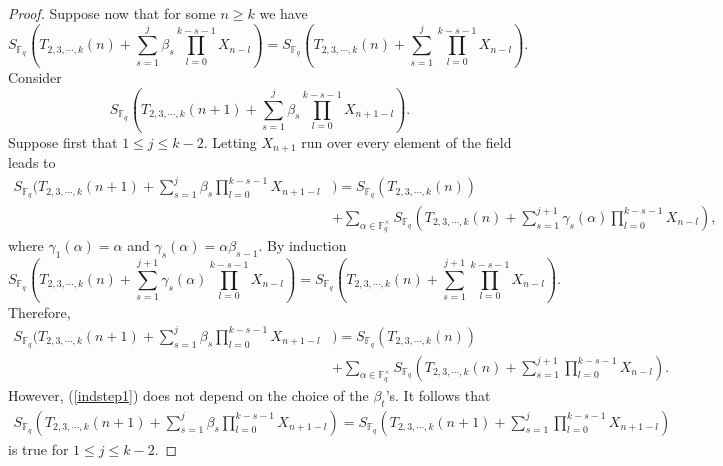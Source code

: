 \begin{proof}
Suppose now that for some $n\geq k$ we have 
\begin{equation}
 S_{\mathbb{F}_q}\left(T_{2,3,\cdots,k}(n)+\sum_{s=1}^j\beta_s\prod_{l=0}^{k-s-1}X_{n-l}\right)=S_{\mathbb{F}_q}\left(T_{2,3,\cdots,k}(n)+\sum_{s=1}^j\prod_{l=0}^{k-s-1}X_{n-l}\right).
\end{equation}
Consider 
\begin{equation}
 S_{\mathbb{F}_q}\left(T_{2,3,\cdots,k}(n+1)+\sum_{s=1}^j\beta_s\prod_{l=0}^{k-s-1}X_{n+1-l}\right).
\end{equation}
Suppose first that $1\leq j \leq k-2$.  Letting $X_{n+1}$ run over every element of the field leads to 
\begin{align}\nonumber
  S_{\mathbb{F}_q}(T_{2,3,\cdots,k}(n+1)+\sum_{s=1}^j\beta_s\prod_{l=0}^{k-s-1}X_{n+1-l}&)=S_{\mathbb{F}_q}\left(T_{2,3,\cdots,k}(n)\right)\\
  &+\sum_{\alpha\in\mathbb{F}_q^{\times}}  S_{\mathbb{F}_q}\left(T_{2,3,\cdots,k}(n)+\sum_{s=1}^{j+1}\gamma_s(\alpha)\prod_{l=0}^{k-s-1}X_{n-l}\right),
\end{align}
where $\gamma_1(\alpha)=\alpha$ and $\gamma_s(\alpha) = \alpha \beta_{s-1}$.  By induction
\begin{equation}
 S_{\mathbb{F}_q}\left(T_{2,3,\cdots,k}(n)+\sum_{s=1}^{j+1}\gamma_s(\alpha)\prod_{l=0}^{k-s-1}X_{n-l}\right)=S_{\mathbb{F}_q}\left(T_{2,3,\cdots,k}(n)+\sum_{s=1}^{j+1}\prod_{l=0}^{k-s-1}X_{n-l}\right).
\end{equation}
Therefore,
\begin{align}\nonumber
\label{indstep1}
  S_{\mathbb{F}_q}(T_{2,3,\cdots,k}(n+1)+\sum_{s=1}^j\beta_s\prod_{l=0}^{k-s-1}X_{n+1-l}&)= S_{\mathbb{F}_q}\left(T_{2,3,\cdots,k}(n)\right)\\
  &+\sum_{\alpha\in\mathbb{F}_q^{\times}}  S_{\mathbb{F}_q}\left(T_{2,3,\cdots,k}(n)+\sum_{s=1}^{j+1}\prod_{l=0}^{k-s-1}X_{n-l}\right).
\end{align}
However, (\ref{indstep1}) does not depend on the choice of the $\beta_t$'s. It follows that
\begin{align}\nonumber
  S_{\mathbb{F}_q}\left(T_{2,3,\cdots,k}(n+1)+\sum_{s=1}^j\beta_s\prod_{l=0}^{k-s-1}X_{n+1-l}\right)= S_{\mathbb{F}_q}\left(T_{2,3,\cdots,k}(n+1)+\sum_{s=1}^j\prod_{l=0}^{k-s-1}X_{n+1-l}\right)
\end{align}
is true for $1\leq j\leq k-2$.


\end{proof}
